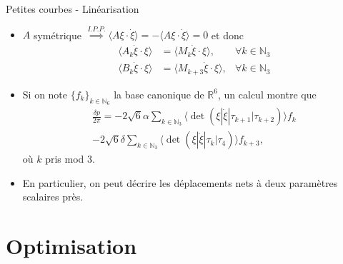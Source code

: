 \documentclass[10pt, envcountsect]{beamer}
\theoremstyle{plain}
\newcommand{\N}{\mathbb{N}}
\newcommand{\R}{\mathbb{R}}
\begin{document}
\begin{frame}{Petites courbes - Linéarisation}
\begin{itemize}
\item $A$ symétrique $\overset{I.P.P.}{\implies} \langle A \xi \cdot \dot{\xi} \rangle = - \langle A \xi \cdot \dot{\xi} \rangle = 0$ et donc
\begin{align}
\langle A_k \dot{\xi} \cdot \xi \rangle &= \langle M_k \dot{\xi} \cdot \xi \rangle, &\forall k \in \N_3\\
\langle B_k \dot{\xi} \cdot \xi \rangle &= \langle M_{k + 3} \dot{\xi} \cdot \xi \rangle, &\forall k \in \N_3
\end{align}

\item Si on note $\{f_k\}_{k \in \N_6}$ la base canonique de $\R^6$, un calcul montre que
\begin{align}
\label{eq: net displacement}
\frac{\delta p}{2 \pi}= - 2  \sqrt{6} \alpha \sum_{k \in \N_3}\langle \det( \xi | \dot{\xi} | \tau_{k+1} | \tau_{k+2})\rangle f_k \nonumber \\ - 2  \sqrt{6} \delta \sum_{k \in \N_3}\langle \det ( \xi | \dot{\xi} | \tau_{k} | \tau_{4})\rangle f_{k + 3},
\end{align}
où $k$ pris mod 3.

\item En particulier, on peut décrire les déplacements nets à deux paramètres scalaires près.

\end{itemize}
\end{frame}


\section{Optimisation}
\end{document}
